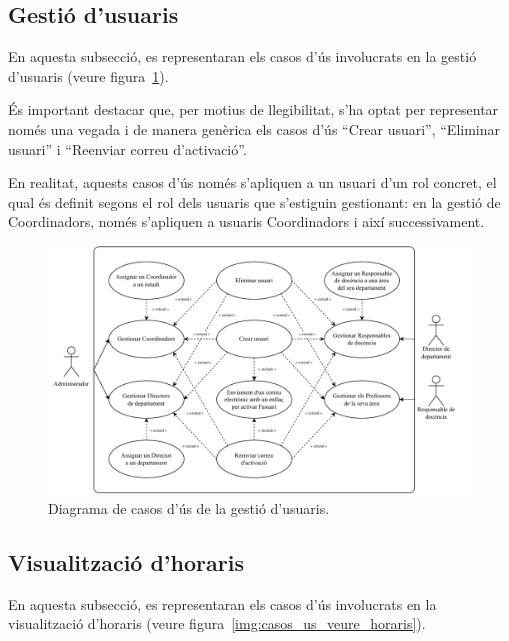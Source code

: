 \documentclass[a4paper,12pt]{ThesisStyle}
\begin{document}
\subsection{Gestió d'usuaris}
\label{subsec:casos_us_usuaris}

En aquesta subsecció, es representaran els casos d'ús involucrats en la gestió d'usuaris (veure figura~\ref{img:casos_us_usuaris}).

És important destacar que, per motius de llegibilitat, s'ha optat per representar només una vegada i de manera genèrica els casos d'ús ``Crear usuari'', ``Eliminar usuari'' i ``Reenviar correu d'activació''.

En realitat, aquests casos d'ús només s'apliquen a un usuari d'un rol concret, el qual és definit segons el rol dels usuaris que s'estiguin gestionant: en la gestió de Coordinadors, només s'apliquen a usuaris Coordinadors i així successivament.

\begin{figure}[H]
  \centering
  \includegraphics[width=\textwidth]{assets/use_cases/usuaris.pdf}
  \caption{\label{img:casos_us_usuaris}Diagrama de casos d'ús de la gestió d'usuaris.}
\end{figure}

\subsection{Visualització d'horaris}
\label{subsec:casos_us_veure_horaris}

En aquesta subsecció, es representaran els casos d'ús involucrats en la visualització d'horaris (veure figura~\ref{img:casos_us_veure_horaris}).
\end{document}
